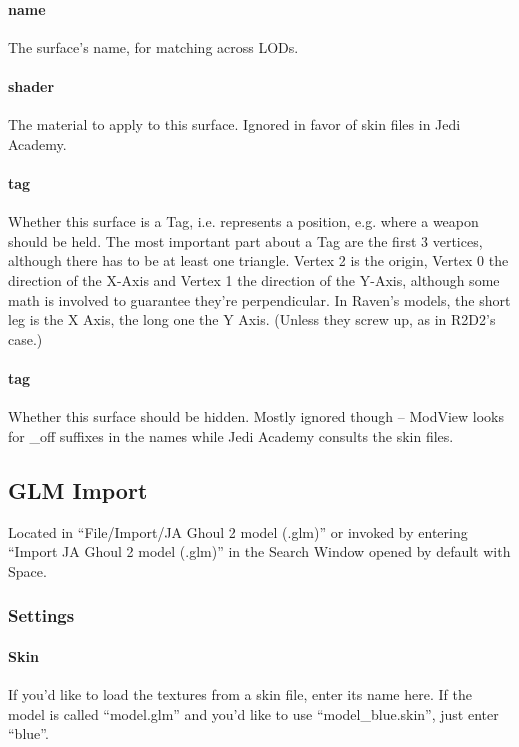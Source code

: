 \documentclass[a4paper,10pt]{article}
\begin{document}
 \paragraph*{name}
 The surface's name, for matching across LODs.
 
 \paragraph*{shader}
 The material to apply to this surface. Ignored in favor of skin files in Jedi Academy.
 
 \paragraph*{tag}
 Whether this surface is a Tag, i.e. represents a position, e.g. where a weapon should be held. The most
 important part about a Tag are the first 3 vertices, although there has to be at least one triangle. Vertex 2
 is the origin, Vertex 0 the direction of the X-Axis and Vertex 1 the direction of the Y-Axis, although some
 math is involved to guarantee they're perpendicular. In Raven's models, the short leg is the X Axis, the
 long one the Y Axis. (Unless they screw up, as in R2D2's case.)
 
 \paragraph*{tag}
 Whether this surface should be hidden. Mostly ignored though -- ModView looks for \_off suffixes in the names
 while Jedi Academy consults the skin files.
 
 
 \subsection{GLM Import}
 
 Located in ``File/Import/JA Ghoul 2 model (.glm)'' or invoked by entering ``Import JA Ghoul 2 model (.glm)''
 in the Search Window opened by default with Space.
 
 \subsubsection*{Settings}
 
 \paragraph*{Skin}
 If you'd like to load the textures from a skin file, enter its name here. If the model is called ``model.glm''
 and you'd like to use ``model\_blue.skin'', just enter ``blue''.
 
\end{document}
